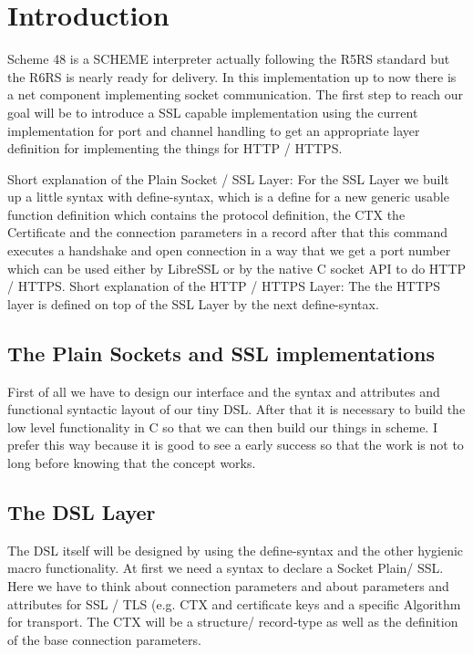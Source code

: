 \documentclass[10pt,a4paper,english]{article}
\begin{document}
\section{Introduction}

\begin{flushleft}
Scheme 48 is a SCHEME interpreter actually following the R5RS standard but the R6RS is nearly ready for delivery. In this implementation up to now there is a net component implementing socket communication.
The first step to reach our goal will be to introduce a SSL capable implementation using the current implementation for port and channel handling to get an appropriate layer definition for  implementing the things for HTTP / HTTPS.
\end{flushleft}
\begin{flushleft}
Short explanation of the Plain Socket / SSL Layer:
For the SSL Layer we built up a little syntax with define-syntax,  which is a define for a new generic usable function definition which contains the protocol definition, the CTX the Certificate and the connection parameters in a record after that this command executes a handshake and  open connection in a way that we  get a port number which can be used either by LibreSSL or by the native C socket API to do HTTP / HTTPS.
Short explanation of the HTTP / HTTPS Layer:
The the HTTPS layer  is defined on top of the SSL Layer by the  next define-syntax.
\end{flushleft}

\subsection{The Plain Sockets and SSL implementations }
\begin{flushleft}
First of all we have to design our interface and the syntax and attributes and functional syntactic layout of our tiny DSL. After that it is necessary to build the low level functionality in C so that we can then build our things in scheme. I prefer this way because it is good to see a early success so that the work is not to long before knowing that the concept works. 
\end{flushleft}

\subsection{The DSL Layer}
\begin{flushleft}
The DSL itself will be designed by using the define-syntax and the other hygienic macro functionality. At first we need a syntax to declare a Socket Plain/ SSL. Here we have to think about connection parameters and about parameters and attributes for SSL / TLS (e.g. CTX and certificate keys and a specific Algorithm for transport. 
The CTX will be a structure/ record-type as well as the definition of the base connection parameters. \end{flushleft}
\end{document}
